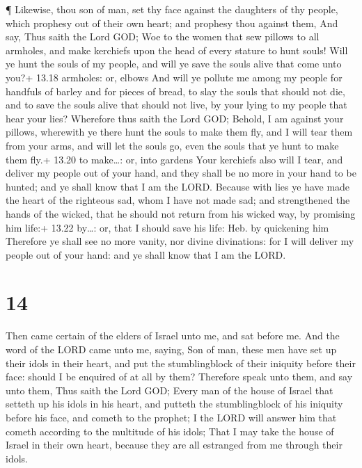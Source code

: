  ¶ Likewise, thou son of man, set thy face against the
daughters of thy people, which prophesy out of their own heart; and
prophesy thou against them,  And say, Thus saith the Lord
GOD; Woe to the women that sew pillows to all armholes, and make
kerchiefs upon the head of every stature to hunt souls! Will ye hunt the
souls of my people, and will ye save the souls alive that come unto
you?+ 13.18 armholes: or, elbows  And will ye pollute me
among my people for handfuls of barley and for pieces of bread, to slay
the souls that should not die, and to save the souls alive that should
not live, by your lying to my people that hear your lies? 
Wherefore thus saith the Lord GOD; Behold, I am against your pillows,
wherewith ye there hunt the souls to make them fly, and I will tear them
from your arms, and will let the souls go, even the souls that ye hunt
to make them fly.+ 13.20 to make\ldots: or, into gardens 
Your kerchiefs also will I tear, and deliver my people out of your hand,
and they shall be no more in your hand to be hunted; and ye shall know
that I am the LORD.  Because with lies ye have made the
heart of the righteous sad, whom I have not made sad; and strengthened
the hands of the wicked, that he should not return from his wicked way,
by promising him life:+ 13.22 by\ldots: or, that I should save his life:
Heb. by quickening him  Therefore ye shall see no more
vanity, nor divine divinations: for I will deliver my people out of your
hand: and ye shall know that I am the LORD.

\hypertarget{section-13}{%
\section{14}\label{section-13}}

 Then came certain of the elders of Israel unto me, and sat
before me.  And the word of the LORD came unto me, saying,
 Son of man, these men have set up their idols in their
heart, and put the stumblingblock of their iniquity before their face:
should I be enquired of at all by them?  Therefore speak
unto them, and say unto them, Thus saith the Lord GOD; Every man of the
house of Israel that setteth up his idols in his heart, and putteth the
stumblingblock of his iniquity before his face, and cometh to the
prophet; I the LORD will answer him that cometh according to the
multitude of his idols;  That I may take the house of Israel
in their own heart, because they are all estranged from me through their
idols.

